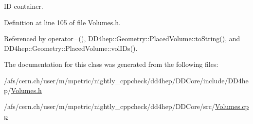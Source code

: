 ID container. 

Definition at line 105 of file Volumes.h.

Referenced by operator=(), DD4hep::Geometry::PlacedVolume::toString(), and DD4hep::Geometry::PlacedVolume::volIDs().

The documentation for this class was generated from the following files:\begin{DoxyCompactItemize}
\item 
/afs/cern.ch/user/m/mpetric/nightly\_\-cppcheck/dd4hep/DDCore/include/DD4hep/\hyperlink{_volumes_8h}{Volumes.h}\item 
/afs/cern.ch/user/m/mpetric/nightly\_\-cppcheck/dd4hep/DDCore/src/\hyperlink{_volumes_8cpp}{Volumes.cpp}\end{DoxyCompactItemize}
